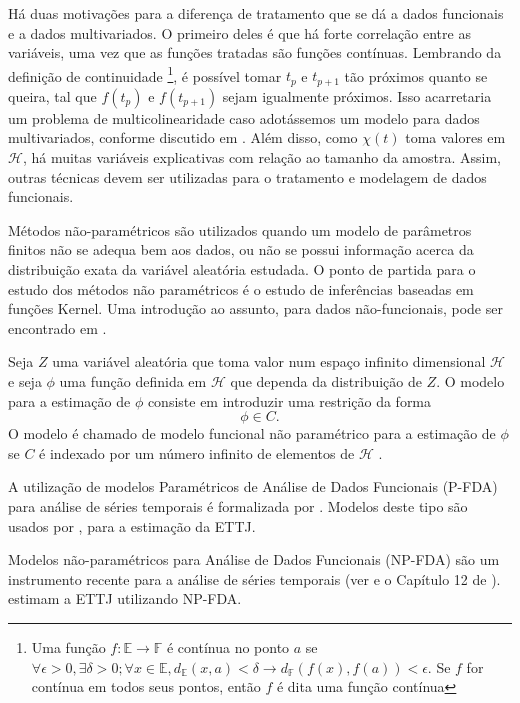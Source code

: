 \documentclass[
	12pt,				%
	openright,			%
	oneside,			%
	a4paper,			%
	english,			%
	brazil				%
	]{dissertacao-ufrgs-abntex2}
\begin{document}
Há duas motivações para a diferença de tratamento que se dá a dados
funcionais e a dados multivariados. O primeiro deles é que há forte
correlação entre as variáveis, uma vez que as funções tratadas são
funções contínuas. Lembrando da definição de continuidade%
\footnote{Uma função $f:\mathbb{E\rightarrow\mathbb{F}}$ é contínua no ponto
$a$ se $\forall\epsilon>0,\exists\delta>0;\forall x\in\mathbb{E},d_{\mathbb{E}}(x,a)<\delta\rightarrow d_{\mathbb{F}}(f(x),f(a))<\epsilon$.
Se $f$ for contínua em todos seus pontos, então $f$ é dita uma função
contínua%
}, é possível tomar $t_{p}$ e $t_{p+1}$ tão próximos quanto se queira,
tal que $f(t_{p})$ e $f(t_{p+1})$ sejam igualmente próximos. Isso
acarretaria um problema de multicolinearidade caso adotássemos um
modelo para dados multivariados, conforme discutido em . Além disso, como $\chi(t)$ toma valores em $\mathcal{H}$, há muitas
variáveis explicativas com relação ao tamanho da amostra. Assim, outras
técnicas devem ser utilizadas para o tratamento e modelagem de dados
funcionais.

Métodos não-paramétricos são utilizados quando um modelo de parâmetros
finitos não se adequa bem aos dados, ou não se possui informação acerca
da distribuição exata da variável aleatória estudada. O ponto de partida
para o estudo dos métodos não paramétricos é o estudo de inferências
baseadas em funções Kernel. Uma introdução ao assunto, para dados não-funcionais, pode ser encontrado 
em .

Seja $Z$ uma variável aleatória que toma valor num espaço infinito
dimensional $\mathcal{H}$ e seja $\phi$ uma função definida em $\mathcal{H}$
que dependa da distribuição de $Z$. O modelo para a estimação de
$\phi$ consiste em introduzir uma restrição da forma
\[
\phi\in C.
\]
O modelo é chamado de modelo funcional não paramétrico para a estimação
de $\phi$ se $C$ é indexado por um número infinito de elementos
de $\mathcal{H}$ \cite{vieu_nonparametric_2006}.

A utilização de modelos Paramétricos de Análise de Dados Funcionais
(P-FDA) para análise de séries temporais
é formalizada por  .
Modelos deste tipo são usados por ,
 para a estimação da ETTJ.

Modelos não-paramétricos para Análise de Dados Funcionais (NP-FDA) são um instrumento recente para a análise
de séries temporais (ver  e o Capítulo 12 de ).
 estimam a ETTJ utilizando
NP-FDA. %
\end{document}
